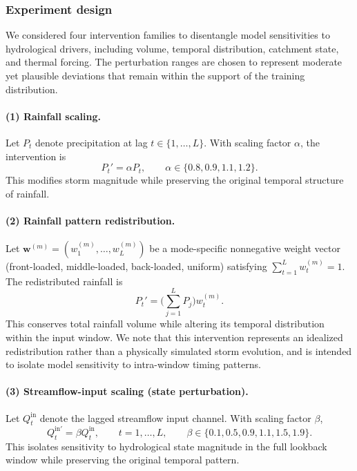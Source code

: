 \documentclass[11pt]{article}
\begin{document}
\subsubsection*{Experiment design}

We considered four intervention families to disentangle model sensitivities to hydrological drivers, including volume, temporal distribution, catchment state, and thermal forcing\cite{hess-30-1077-2026}. The perturbation ranges are chosen to represent moderate yet plausible deviations that remain within the support of the training distribution.

\paragraph{(1) Rainfall scaling.}
Let $P_t$ denote precipitation at lag $t\in\{1,\dots,L\}$. With scaling factor $\alpha$, the intervention is
\begin{equation}
    P_t' = \alpha P_t,
    \qquad
    \alpha\in\{0.8,0.9,1.1,1.2\}.
\end{equation}
This modifies storm magnitude while preserving the original temporal structure of rainfall\cite{nearing2021role}.

\paragraph{(2) Rainfall pattern redistribution.}
Let $\mathbf{w}^{(m)}=(w_1^{(m)},\dots,w_L^{(m)})$ be a mode-specific nonnegative weight vector (front-loaded, middle-loaded, back-loaded, uniform) satisfying $\sum_{t=1}^{L}w_t^{(m)}=1$. The redistributed rainfall is
\begin{equation}
    P_t' = \Big(\sum_{j=1}^{L}P_j\Big) w_t^{(m)}.
\end{equation}
This conserves total rainfall volume while altering its temporal distribution within the input window\cite{Wrr_p_q}. We note that this intervention represents an idealized redistribution rather than a physically simulated storm evolution, and is intended to isolate model sensitivity to intra-window timing patterns.

\paragraph{(3) Streamflow-input scaling (state perturbation).}
Let $Q_t^{\mathrm{in}}$ denote the lagged streamflow input channel. With scaling factor $\beta$,
\begin{equation}
    Q_t^{\mathrm{in}\prime} = \beta Q_t^{\mathrm{in}},
    \qquad t=1,\dots,L,
    \qquad
    \beta\in\{0.1,0.5,0.9,1.1,1.5,1.9\}.
\end{equation}
This isolates sensitivity to hydrological state magnitude in the full lookback window while preserving the original temporal pattern\cite{apak2026multi}.
\end{document}
